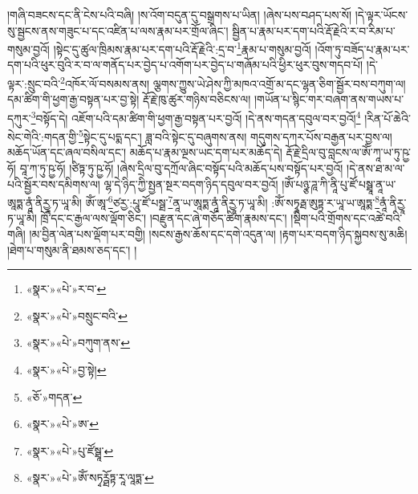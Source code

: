 །གཞི་བཟངས་དང་ནི་ངེས་པའི་བཞི། །ས་འོག་བདུན་དུ་བསྒྲགས་པ་ཡིན། །ཞེས་པས་བཤད་པས་སོ། །དེ་ལྟར་ཡོངས་སུ་སྦྱངས་ནས་གཟུང་པ་དང་འཛིན་པ་ལས་རྣམ་པར་གྲོལ་ཞིང་། སྦྱིན་པ་རྣམ་པར་དག་པའི་རྡོ་རྗེའི་ར་བ་རིམ་པ་གསུམ་བྱའོ། །སྟེང་དུ་ཚུལ་ཁྲིམས་རྣམ་པར་དག་པའི་རྡོ་རྗེའི་:དྲ་བ་\footnote{«སྣར་»«པེ་»ར་བ་}རྣམ་པ་གསུམ་བྱའོ། །འོག་ཏུ་བཟོད་པ་རྣམ་པར་དག་པའི་ཕུར་བུའི་ར་བ་ལ་གནོད་པར་བྱེད་པ་འགོག་པར་བྱེད་པ་གཞོམ་པའི་ཕྱིར་ཕུར་བུས་གདབ་པོ། །དེ་ལྟར་:སྲུང་བའི་\footnote{«སྣར་»«པེ་»བསྲུང་བའི་}འཁོར་ལོ་བསམས་ནས། ལྕགས་ཀྱུས་ཡེ་ཤེས་ཀྱི་མཁའ་འགྲོ་མ་དང་ལྷན་ཅིག་སྦྱོར་བས་བཀུག་ལ། དམ་ཚིག་གི་ཕྱག་རྒྱ་བསྟན་པར་བྱ་སྟེ། རྡོ་རྗེ་ཁུ་ཚུར་གཉིས་བཅིངས་ལ། །གཡོན་པ་སྙིང་གར་བཞག་ནས་གཡས་པ་དཀུར་\footnote{«སྣར་»«པེ་»བཀུག་ནས་}བསྟོད་དེ། འཇོག་པའི་དམ་ཚིག་གི་ཕྱག་རྒྱ་བསྟན་པར་བྱའོ། །དེ་ནས་གདན་དབུལ་བར་བྱའོ།\footnote{«སྣར་»«པེ་»བྱ་སྟེ།} །རིན་པོ་ཆེའི་སེང་གེའི་:གདན་གྱི་\footnote{«ཅོ་»གདན་}སྟེང་དུ་པདྨ་དང་། ཟླ་བའི་སྟེང་དུ་བཞུགས་ནས། གདུགས་དཀར་པོས་བརྒྱན་པར་བྱས་ལ། མཆོད་ཡོན་དང་ཞལ་བསིལ་དང་། མཆོད་པ་རྣམ་ལྔས་ཡང་དག་པར་མཆོད་དེ། རྡོ་རྗེ་དྲིལ་བུ་བླངས་ལ་ཨོཾ་ཀཱ་ཡ་ཏུ་ཥྱ་ཧོ། བཱ་ཀ་ཏུ་ཥྱ་ཧོ། །ཙིཏྟ་ཏུ་ཥྱ་ཧོ། །ཞེས་དྲིལ་བུ་དཀྲོལ་ཞིང་བསྟོད་པའི་མཆོད་པས་བསྟོད་པར་བྱའོ། །དེ་ནས་ཐ་མ་ལ་པའི་སྦྱོར་བས་དམིགས་ལ། ལྷ་དེ་ཉིད་ཀྱི་སྤྱན་སྔར་བདག་ཉིད་དབུལ་བར་བྱའོ། །ཨོཾ་པཉྩ་ཌཱ་ཀི་ནཱི་པུ་ཛོ་པསྠཱ་ནཱ་ཡ་ཨཱཏྨ་ནཱཾ་ནིརྱཱ་ཏ་ཡཱ་མི། ཨོཾ་ཨཱ་\footnote{«སྣར་»«པེ་»ཨ་}ཙརྱ་:པཱུ་ཛོ་པསྠ་\footnote{«སྣར་»«པེ་»པུ་ཛོསྠཱ་}ནཱ་ཡ་ཨཱཏྨ་ནཱཾ་ནིརྱཱ་ཏ་ཡཱ་མི། :ཨོཾ་སཏྭཱརྠ་ཨུཏྟ་ར་ཡཱ་ཡ་ཨཱཏྨ་\footnote{«སྣར་»«པེ་»ཨོཾ་སཏྭཪྠོཏྟ་རཱ་ལཱཏྨ་}ནཱཾ་ནིརྱཱ་ཏ་ཡཱ་མི། ཁྲོ་དང་ང་རྒྱལ་ལས་ལྡོག་ཅིང་། །བརྫུན་དང་ཞེ་གཅོད་ཚིག་རྣམས་དང་། །སྡིག་པའི་གྲོགས་དང་འཚེ་བའི་གཞི། །མ་བྱིན་ལེན་པས་ལྡོག་པར་བགྱི། །སངས་རྒྱས་ཆོས་དང་དགེ་འདུན་ལ། །རྟག་པར་བདག་ཉིད་སྐྱབས་སུ་མཆི། །ཐེག་པ་གསུམ་ནི་ཐམས་ཅད་དང་། །
